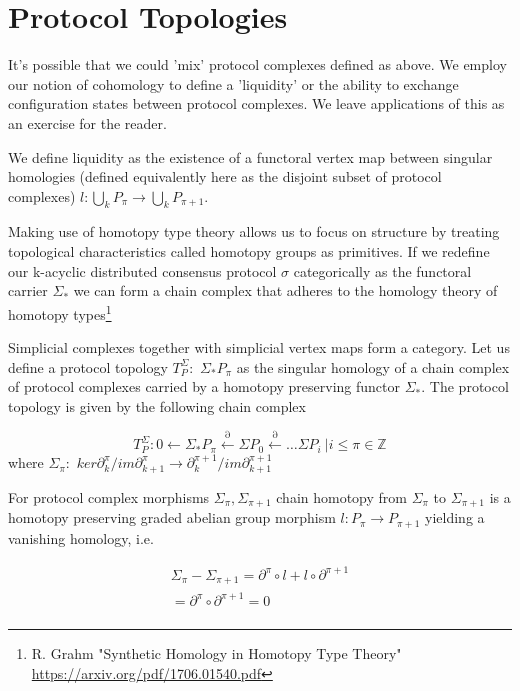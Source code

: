 \documentclass{article}
\begin{document}
\section{Protocol Topologies}
It's possible that we could 'mix' protocol complexes defined as above. We employ our notion of cohomology to define a 'liquidity' or the ability to exchange configuration states between protocol complexes. We leave applications of this as an exercise for the reader.

We define liquidity as the existence of a functoral vertex map between singular homologies (defined equivalently here as the disjoint subset of protocol complexes) $l: \bigcup_{k} P_{\pi} \rightarrow \bigcup_{k} P_{\pi+1}$.

Making use of homotopy type theory allows us to focus on structure by treating topological characteristics called homotopy groups as primitives. If we redefine our k-acyclic distributed consensus protocol $\sigma$ categorically as the functoral carrier $\Sigma_{*}$  we can form a chain complex that adheres to the homology theory of homotopy types\footnote{R. Grahm "Synthetic Homology in Homotopy Type Theory" \url{https://arxiv.org/pdf/1706.01540.pdf}}

Simplicial complexes together with simplicial vertex maps form a category. Let us define a protocol topology $T^{\Sigma}_P: $ $\Sigma_{*}P_\pi$ as the singular homology of a chain complex of protocol complexes carried by a homotopy preserving functor $\Sigma_*$. The protocol topology is given by the following chain complex

\begin{equation} \label{eq1}
T^{\Sigma}_P: 0 \leftarrow \Sigma_{*}P_\pi \xleftarrow{\partial} \Sigma P_{0} \xleftarrow{\partial} \dots \Sigma P_i \ | i \leq \pi \in \mathbb{Z}
\end{equation} \label{eq1}
where $\Sigma_\pi: $ $ker \partial^{\pi}_{k}/im \partial^{\pi}_{k+1} \rightarrow \partial^{\pi+1}_{k} /im \partial^{\pi+1}_{k+1}$ 

For protocol complex morphisms $\Sigma_\pi, \Sigma_{\pi+1}$ chain homotopy from $\Sigma_\pi$ to $\Sigma_{\pi+1}$ is a homotopy preserving graded abelian group morphism $l: P_{\pi} \rightarrow P_{\pi+1}$ yielding a vanishing homology, i.e. 

\begin{equation} \label{eq1}
\begin{split}
\Sigma_\pi - \Sigma_{\pi+1} =  \partial^{\pi}\circ l + l \circ \partial^{\pi+1} \\
= \partial^\pi \circ \partial^{\pi+1} = 0 \\
\end{split}
\end{equation}
\end{document}

